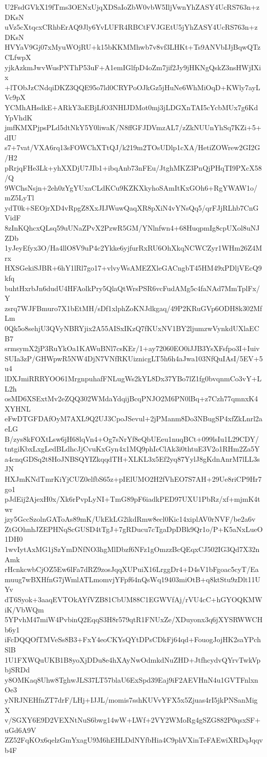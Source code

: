 U2FsdGVkX19fTms3OENxUjqXDSaIoZbW0vbW5IljVwnYhZASY4UcRS763n+zDKsN
uVz5cXtqcxCRhbErAQ9Jly6YvLUFR4RBCtFVJGEtU5jYhZASY4UcRS763n+zDKsN
HVYaV9Gj07xMyuWOjRU+k15bKKMMhwb7v8vf3LHKt+Ts9ANVbIJjBqwQTzCLfwpX
yjkAzkmJwvWusPNThP53uF+A1emIGlfpD4oZm7jif2Jy9jHKNgQskZ3nsHWjIXix
+lTObJzCNdqiDKZ3QQE95o7ld0CRYPoOJkGz5jHuNe6WhMiOqD+KWly7ayLVc9pX
YCMhAHsdkE+ARkY3aEBjLfO3NHIJDMot0mj3jLDGXnTAI5cYcbMUx7g6KdYpVhdK
jmfKMXPjpsPLd5dtNkY5Y0liwaK/N8ffGFJDVmzAL7/zZkNUUnYhSq7KZi+5+dIU
s7+7vat/VXA6rq13sFOWChXTtQJ/k219m2TOsUDlp1cXA/HetiZOWrew2GI2G/H2
pRrjqFHe3Lk+yhXXDjU7JIb1+ibqAnb73nFEu/JtghMKZ3PnQjPHqTI9PXcX58/Q
9WChsNsjn+2eh0zYgYUxaCLdKCu9KZKXkyhoSAmItKxGOh6+RgYWAW1o/mZ5LyTl
ydT0k+SEOjrXD4vRpgZ8XxJIJWuwQaqXR8pXiN4vYNsQq5/qrFJjRLhb7CnGVidF
8zInKQhcxQLsq59uUNaZPvX2PzwR5GM/YNlnfwn4+68HuqpmIg8cpUXol8uNJZDb
1yJeyEfyx3O/Ha4llO8V9uP4c2Ykke6yjfurRxRU6OhXkqNCWCZyr1WHm26Z4Mrx
HXSGekiSJBR+6hY1lRl7go17+vlvyWsAMEZXleGACngbT45HM49xPDljVEcQ9kfq
buhtHxrbJn6dudU4HFAolkPry5QlaQtWrsPSR6vcFudAMg5c4faNAd7MmTplFx/Y
zsrq7WJFBmuro7X1bEtMH/sDf1xlphZoKNJdkgaq/49P2KRuGVp6ODH8k302MfLm
0Qk5o8sehjU3QVyNBRYjix2A55AISxIKzQ7fKUxNV1BY2ljumzwVynkdUXlaECB7
srmsymX2jP3RuYkOa1KAWuBNl7csKEr/1+ay72060EO0iJJB3YsXFsfpo3I+Iuiv
SUIa3zP/GHWpwR5NW4DjN7VNfRKUiznicgLT5h6h4aJwa103NfQuIAsI/5EV+5u4
lDXJmiRRRYOO61MrgnpuhafFNLugWs2kYL8Dx37YBo7lZ1fg0bvqnmCo3vY+LL2h
osMD6XSExtMv2eZQQ302WMdaYdqijBcqPNJO2M6PN0lBq+z7Czh77qmnxK4XYHNL
eFwDTGFDAfOyM7AXL9Q2UJ3CpoJSevul+2jPManm8Do3NBugSP4xfZkLnrl2aeLG
B/zys8kFOXtLsw6jH68lqVn4+Og7sNrYf8eQbUEeu1nuqBCt+099lsIu1L29CDY/
tntgiKbxLxgLedBLdhcJjCvuKxGyn4x1MQ9phIcClAk3i0thtuE3V2o1RHm2Za5Y
a4cnqGDSq2t8HoJNBSQYIZkqqdTH+XLKL3x5Ef2yq87YylJ8gKdnAnrM7lLL3sJN
HXJmKNdTmrKiYjCUZ0elfbS65z+pIElUMO2H2fVhEO7S7AH+29Ue8riCP9Hr7go1
pJdEij2AjexH0x/Xk6rPvpLyNI+TmG89pF6iadkPED97UXU1PbRz/xf+mjmK4twr
jzy5GccSzolnGAToAs89mK/UkEkLG2ikdRmw8ecl0Kic14xiplAV0rNVF/be2a6v
ZtGOhnhJZEPHNqScGUSD4tTgJ+7gRDucu7cTgaDpDBk9Qr1o/P+K5aNxLueO1DH0
1wvIytAxMG1jSzYmDNfNO3hgMlDbzf6NFz1gOmzzBcQEqxCJ502IG3Qd7X32nAmk
rHcnkcwbCjOZ5Ew6lFa7dRZ9zosJqqXUPuiX16LrggDr4+D4sV1bFgoac5cyT/Ea
muug7wBXHfnG7jWmlATLmomvjYFpf64nQsWq19403miOtB+q8ktStu9zDlt11UYv
dT6Syok+3aaqEVTOkAYfVZB81CbUM88C1EGWVfAj/rVU4cC+hGYOQKMWiK/VbWQm
5YPvhM47miW4PvbinQ2EqqS3H8r579qtR1FNUxZe/XDuyonx3q6jXYSRWWCHb6y1
iFcDQQOfTMVeSs8B3+FxY4eoCKYsQYtDPsCDkFj64qd+FouogJojHK2saYPchSlB
1U1FXWQuUKB1B8yoXjDDu8e4hXAyNwOdmkdNuZHD+JtfhcydvQYrvTwkVpbjSRDd
y8OMKaq8Uhw8TghwJLS37LT57blaU6ExSpd39Eaj9iF2AEVHnN4u1GVTFnlxnOe3
yNRJNEHfnZT7drF/LHj+IJJL/momis7sshKUVvYFX5x5Zjuas4rI5jkPNSanMigX
v/SGXY6E9D2VEXNtNuS6bwg14wW+LWf+2VY2WMoRg4gSZG882P0qsxSF+uGd6A9V
ZZ52FqKOx6qelzGmYxagU9M6hEHLDdNYfbHia4C9phVXinTeFAEwiXRDqJqqvb4F
